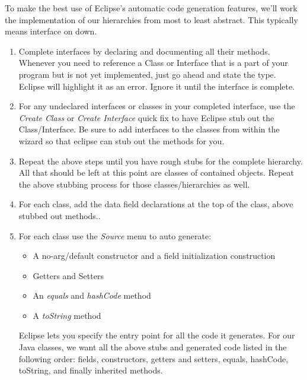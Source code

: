 \documentclass[nobib]{tufte-handout}
\begin{document}
To make the best use of Eclipse's automatic code generation features, we'll work the implementation of our hierarchies from most to least abstract.  This typically means interface on down.
\begin{enumerate}

\item Complete interfaces by declaring and documenting all their methods. \newline
Whenever you need to reference a Class or Interface that is a part of your program but is not yet implemented, just go ahead and state the type. Eclipse will highlight it as an error. Ignore it until the interface is complete.

\item For any undeclared interfaces or classes in your completed interface, use the \textit{Create Class} or \textit{Create Interface} quick fix to have Eclipse stub out the Class/Interface. Be sure to add interfaces to the classes from within the wizard so that eclipse can stub out the methods for you.

\item Repeat the above steps until you have rough stubs for the complete hierarchy. All that should be left at this point are classes of contained objects. Repeat the above stubbing process for those classes/hierarchies as well.

\item For each class, add the data field declarations at the top of the class, above stubbed out methods..

\item For each class use the \textit{Source} menu to auto generate:
\begin{itemize}
\item A no-arg/default constructor and a field initialization construction
\item Getters and Setters
\item An \textit{equals} and \textit{hashCode} method
\item A \textit{toString} method
\end{itemize}
Eclipse lets you specify the entry point for all the code it generates. For our Java classes, we want all the above stubs and generated code listed in the following order: fields, constructors, getters and setters, equals, hashCode, toString, and finally inherited methods.


\end{enumerate}
\end{document}
